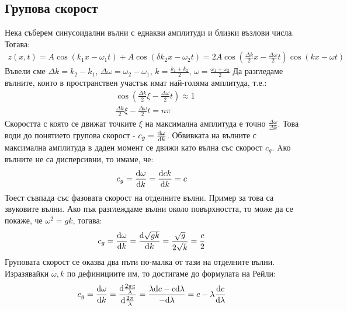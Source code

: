\subsection{Групова скорост}
Нека съберем синусоидални вълни с еднакви амплитуди и близки възлови числа. Тогава:
\begin{align}
	z(x, t) = A \cos (k_1 x - \omega_1 t) + A \cos (\delta k_2 x - \omega_2 t) = 2 A \cos (\frac{\Delta k}{2} x - \frac{\Delta \omega}{2} t) \cos (k x - \omega t)
\end{align}
Въвели сме $\Delta k = k_2 - k_1$, $\Delta \omega = \omega_2 - \omega_1$, $k = \frac {k_1 + k_2}{2}$, $\omega = \frac{\omega_1 + \omega_2}{2}$
Да разгледаме вълните, които в пространствен участък имат най-голяма амплитуда, т.е.:
\begin{align}
	&\cos (\frac{\Delta k}{2} \xi - \frac{\Delta \omega}{2} t) \approx 1 \\
	&\frac{\Delta k}{2} \xi - \frac{\Delta \omega}{2} t = n \pi
\end{align}
Скоростта с която се движат точките $\xi$ на максимална амплитуда е точно $\frac{\Delta \omega}{\Delta k}$.
Това води до понятието групова скорост - $c_g = \dv{\omega}{k}$.
Обвивката на вълните с максимална амплитуда в даден момент се движи като вълна със скорост $c_g$.
Aко вълните не са дисперсивни, то имаме, че:
\begin{equation}
	c_g = \dv{\omega}{k} = \dv{c k}{k} = c
\end{equation}
Тоест съвпада със фазовата скорост на отделните вълни. Пример за това са звуковите вълни.
Ако пък разглеждаме вълни около повърхността, то може да се покаже, че $\omega^2 = g k$, тогава:
\begin{equation}
	c_g = \dv{\omega}{k} = \dv{\sqrt{g k}}{k} = \frac{\sqrt{g}}{2 \sqrt{k}} = \frac{c}{2}
\end{equation}
Груповата скорост се оказва два пъти по-малка от тази на отделните вълни.
Изразявайки $\omega, k$ по дефинициите им, то достигаме до формулата на Рейли:
\begin{equation}
	c_g = \dv{\omega}{k} = \dv{\frac{2 \pi c}{\lambda}}{\frac{2 \pi}{\lambda}} = \frac{\lambda \dd c - c \dd \lambda}{- \dd \lambda} = c - \lambda \dv{c}{\lambda}
\end{equation}